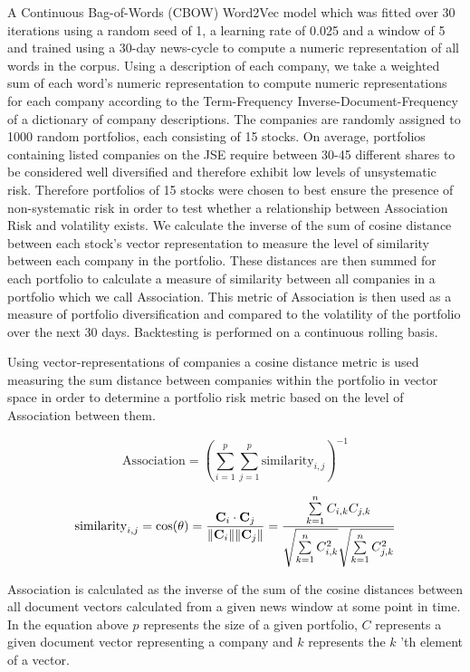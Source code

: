 \documentclass[11pt]{article}
\begin{document}
A Continuous Bag-of-Words (CBOW) Word2Vec model which was fitted over 30
iterations using a random seed of 1, a learning rate of 0.025 and a
window of 5 and trained using a 30-day news-cycle to compute a numeric
representation of all words in the corpus. Using a description of each
company, we take a weighted sum of each word's numeric representation to
compute numeric representations for each company according to the
Term-Frequency Inverse-Document-Frequency of a dictionary of company
descriptions. The companies are randomly assigned to 1000 random
portfolios, each consisting of 15 stocks. On average, portfolios
containing listed companies on the JSE require between 30-45 different
shares to be considered well diversified and therefore exhibit low
levels of unsystematic risk. Therefore portfolios of 15 stocks were
chosen to best ensure the presence of non-systematic risk in order to
test whether a relationship between Association Risk and volatility
exists. We calculate the inverse of the sum of cosine distance between
each stock's vector representation to measure the level of similarity
between each company in the portfolio. These distances are then summed
for each portfolio to calculate a measure of similarity between all
companies in a portfolio which we call Association. This metric of
Association is then used as a measure of portfolio diversification and
compared to the volatility of the portfolio over the next 30 days.
Backtesting is performed on a continuous rolling basis.

Using vector-representations of companies a cosine distance metric is
used measuring the sum distance between companies within the portfolio
in vector space in order to determine a portfolio risk metric based on
the level of Association between them.

\[ \text{Association}=(\sum_{i=1}^{p} \sum_{j=1}^{p} \text{similarity}_{i,j})^{-1} \]

\[ \text{similarity}_{i,j} = \cos(\theta) = {\mathbf{C}_{i} \cdot \mathbf{C}_{j} \over \|\mathbf{C}_{i}\| \|\mathbf{C}_{j}\|} = \frac{ \sum\limits_{k=1}^{n}{C_{i,k}  C_{j,k}} }{ \sqrt{\sum\limits_{k=1}^{n}{C_{i,k}^2}}  \sqrt{\sum\limits_{k=1}^{n}{C_{j,k}^2}} } \]

Association is calculated as the inverse of the sum of the cosine
distances between all document vectors calculated from a given news
window at some point in time. In the equation above \(p\) represents the
size of a given portfolio, \(C\) represents a given document vector
representing a company and \(k\) represents the \(k\) 'th element of a
vector.
\end{document}

